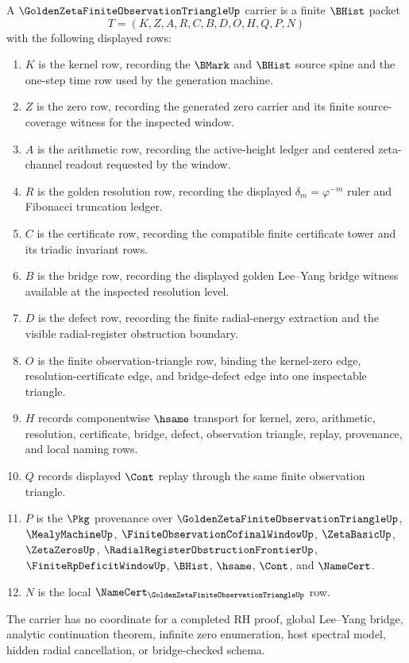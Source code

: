 \begin{definition}
\label{def:golden-zeta-finite-observation-triangle-carrier}
A $\GoldenZetaFiniteObservationTriangleUp$ carrier is a finite $\BHist$ packet
$$
T=(K,Z,A,R,C,B,D,O,H,Q,P,N)
$$
with the following displayed rows:
\begin{enumerate}
\item $K$ is the kernel row, recording the $\BMark$ and $\BHist$ source spine and the one-step time row used by the generation machine.
\item $Z$ is the zero row, recording the generated zero carrier and its finite source-coverage witness for the inspected window.
\item $A$ is the arithmetic row, recording the active-height ledger and centered zeta-channel readout requested by the window.
\item $R$ is the golden resolution row, recording the displayed $\delta_m=\varphi^{-m}$ ruler and Fibonacci truncation ledger.
\item $C$ is the certificate row, recording the compatible finite certificate tower and its triadic invariant rows.
\item $B$ is the bridge row, recording the displayed golden Lee--Yang bridge witness available at the inspected resolution level.
\item $D$ is the defect row, recording the finite radial-energy extraction and the visible radial-register obstruction boundary.
\item $O$ is the finite observation-triangle row, binding the kernel-zero edge, resolution-certificate edge, and bridge-defect edge into one inspectable triangle.
\item $H$ records componentwise $\hsame$ transport for kernel, zero, arithmetic, resolution, certificate, bridge, defect, observation triangle, replay, provenance, and local naming rows.
\item $Q$ records displayed $\Cont$ replay through the same finite observation triangle.
\item $P$ is the $\Pkg$ provenance over $\GoldenZetaFiniteObservationTriangleUp$, $\MealyMachineUp$, $\FiniteObservationCofinalWindowUp$, $\ZetaBasicUp$, $\ZetaZerosUp$, $\RadialRegisterObstructionFrontierUp$, $\FiniteRpDeficitWindowUp$, $\BHist$, $\hsame$, $\Cont$, and $\NameCert$.
\item $N$ is the local $\NameCert_{\GoldenZetaFiniteObservationTriangleUp}$ row.
\end{enumerate}
The carrier has no coordinate for a completed RH proof, global Lee--Yang bridge, analytic continuation theorem, infinite zero enumeration, host spectral model, hidden radial cancellation, or bridge-checked schema.
\end{definition}

